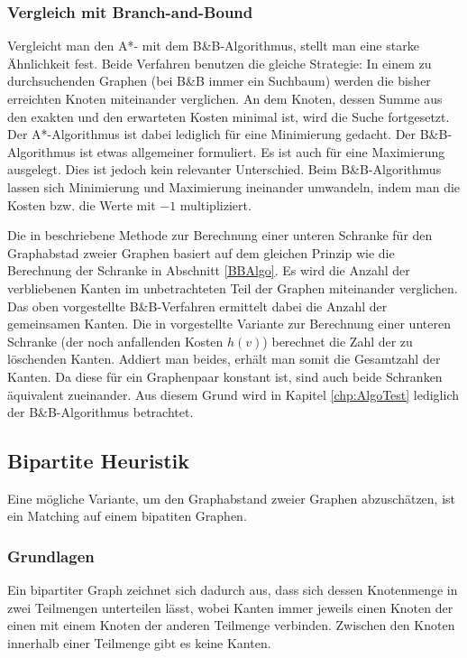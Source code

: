 \subsubsection{Vergleich mit Branch-and-Bound}
Vergleicht man den A*- mit dem B\&B-Algorithmus, stellt man 
eine starke Ähnlichkeit fest. Beide Verfahren benutzen die 
gleiche Strategie: In einem zu durchsuchenden Graphen (bei 
B\&B immer ein Suchbaum) werden die bisher erreichten Knoten 
miteinander verglichen. An dem Knoten, dessen Summe aus den 
exakten und den erwarteten Kosten minimal ist, wird die 
Suche fortgesetzt. Der A*-Algorithmus ist dabei lediglich 
für eine Minimierung gedacht. Der B\&B-Algorithmus ist etwas 
allgemeiner formuliert. Es ist auch für eine Maximierung 
ausgelegt. Dies ist jedoch kein relevanter Unterschied. Beim 
B\&B-Algorithmus lassen sich Minimierung und Maximierung 
ineinander umwandeln, indem man die Kosten bzw. die Werte 
mit $-1$ multipliziert. 

Die in \cite{phdRiesen} beschriebene Methode zur Berechnung einer unteren Schranke 
für den Graphabstad zweier Graphen basiert auf dem gleichen Prinzip wie 
die Berechnung der Schranke in Abschnitt \ref{BBAlgo}. Es wird die Anzahl der 
verbliebenen Kanten im unbetrachteten Teil der Graphen miteinander verglichen. 
Das oben vorgestellte B\&B-Verfahren ermittelt dabei die Anzahl der gemeinsamen 
Kanten. Die in \cite{phdRiesen} vorgestellte Variante zur Berechnung einer unteren 
Schranke (der noch anfallenden Kosten $h(v)$) berechnet die Zahl der zu löschenden 
Kanten. Addiert man beides, erhält man somit die Gesamtzahl der Kanten. Da diese 
für ein Graphenpaar konstant ist, sind auch beide Schranken äquivalent zueinander. 
Aus diesem Grund wird in Kapitel \ref{chp:AlgoTest} lediglich der B\&B-Algorithmus
betrachtet.

\subsection{Bipartite Heuristik}
Eine mögliche Variante, um den Graphabstand zweier Graphen abzuschätzen, ist ein 
Matching auf einem bipatiten Graphen.


\subsubsection{Grundlagen}
Ein bipartiter Graph zeichnet sich dadurch aus, dass sich dessen Knotenmenge 
in zwei Teilmengen unterteilen lässt, wobei Kanten immer jeweils einen Knoten 
der einen mit einem Knoten der anderen Teilmenge verbinden. Zwischen den Knoten 
innerhalb einer Teilmenge gibt es keine Kanten.

